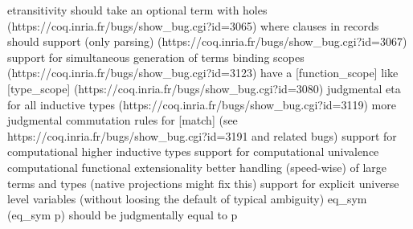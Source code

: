 \begin{frame}
etransitivity should take an optional term with holes (https://coq.inria.fr/bugs/show_bug.cgi?id=3065)
where clauses in records should support (only parsing) (https://coq.inria.fr/bugs/show_bug.cgi?id=3067)
support for simultaneous generation of terms binding scopes (https://coq.inria.fr/bugs/show_bug.cgi?id=3123)
have a [function_scope] like [type_scope] (https://coq.inria.fr/bugs/show_bug.cgi?id=3080)
judgmental eta for all inductive types (https://coq.inria.fr/bugs/show_bug.cgi?id=3119)
more judgmental commutation rules for [match] (see https://coq.inria.fr/bugs/show_bug.cgi?id=3191 and related bugs)
support for computational higher inductive types
support for computational univalence
computational functional extensionality
better handling (speed-wise) of large terms and types (native projections might fix this)
support for explicit universe level variables (without loosing the default of typical ambiguity)
eq_sym (eq_sym p) should be judgmentally equal to p


\end{frame}
